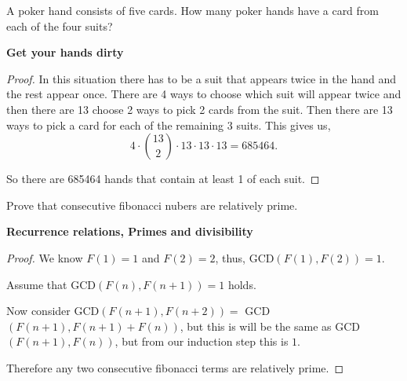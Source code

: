\documentclass[11pt]{article}
\newenvironment{problem}[2][Problem\!]{\begin{trivlist}
\item[\hskip \labelsep {\bfseries #1}\hskip \labelsep {\bfseries #2}]}{\end{trivlist}}
\begin{document}
\begin{tcolorbox}
    \begin{problem} {OC | 11/03 | 77.}
        A poker hand consists of five cards. How many poker hands have a card from each of the four suits?
    \end{problem}
    \textbf{Get your hands dirty}
\end{tcolorbox}
\begin{proof}
    In this situation there has to be a suit that appears twice in the hand and the rest appear once. There are 4 ways to choose which suit will appear twice and then there are 13 choose 2 ways to pick 2 cards from the suit. Then there are 13 ways to pick a card for each of the remaining 3 suits. This gives us,
    \[4 \cdot \binom{13}{2} \cdot 13 \cdot 13 \cdot 13 = 685464. \]

    So there are 685464 hands that contain at least 1 of each suit.
\end{proof}

\begin{tcolorbox}
    \begin{problem} {OC | 11/08 | 83.}
        Prove that consecutive fibonacci nubers are relatively prime.
    \end{problem}
    \textbf{Recurrence relations, Primes and divisibility}
\end{tcolorbox}
\begin{proof}
    We know $F(1) = 1$ and $F(2) = 2$, thus, GCD$(F(1), F(2)) = 1$. 
    
    Assume that GCD$(F(n), F(n+1)) = 1$ holds.
    
    Now consider GCD$(F(n+1), F(n+2)) = $ GCD$(F(n+1), F(n+1) + F(n))$, but this is will be the same as GCD$(F(n+1), F(n))$, but from our induction step this is $1$.

    Therefore any two consecutive fibonacci terms are relatively prime.
\end{proof}
\end{document}
